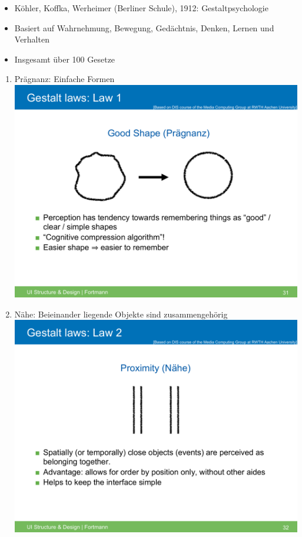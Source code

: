 \begin{itemize}
\item
  Köhler, Koffka, Werheimer (Berliner Schule), 1912: Gestaltpsychologie
\item
  Basiert auf Wahrnehmung, Bewegung, Gedächtnis, Denken, Lernen und
  Verhalten
\item
  Insgesamt über 100 Gesetze
\end{itemize}

\begin{enumerate}[1.]
\item
  Prägnanz: Einfache Formen \includegraphics{inc/gestalt_1.pdf}
\item
  Nähe: Beieinander liegende Objekte sind zusammengehörig
  \includegraphics{inc/gestalt_2.pdf}

\end{enumerate}
